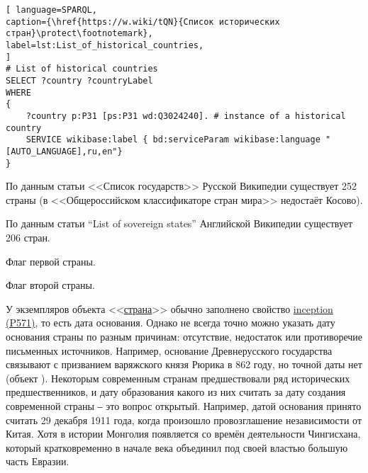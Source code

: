 \begin{lstlisting}[ language=SPARQL, 
caption={\href{https://w.wiki/tQN}{Список исторических стран}\protect\footnotemark},
label=lst:List_of_historical_countries, 
]
# List of historical countries
SELECT ?country ?countryLabel
WHERE
{
	?country p:P31 [ps:P31 wd:Q3024240]. # instance of a historical country 
	SERVICE wikibase:label { bd:serviceParam wikibase:language "[AUTO_LANGUAGE],ru,en"} 
}
\end{lstlisting}



По данным статьи <<Список государств>>\cite{list_of_sovereign_states} Русской Википедии существует 252 страны (в  <<Общероссийском классификаторе стран мира>> недостаёт Косово).

По данным статьи ``List of sovereign states''\cite{list_of_sovereign_states_en} Английской Википедии существует 206 стран.

\begin{marginfigure}[0.0cm]
	{
		\setlength{\fboxsep}{0pt}%
		\setlength{\fboxrule}{1pt}%
	}
	\caption{Флаг первой страны.}%
	\label{fig:flag_kor}%
\end{marginfigure}
\begin{marginfigure}[0.0cm]
	{
		\setlength{\fboxsep}{0pt}%
		\setlength{\fboxrule}{1pt}%
	}
	\caption{Флаг второй страны.}%
	\label{fig:flag_singapore}%
\end{marginfigure}


У экземпляров объекта <<\href{https://www.wikidata.org/wiki/Q6256}{страна}>> обычно заполнено свойство \href{https://www.wikidata.org/wiki/Property:P571}{inception (P571)}, то есть дата основания. Однако не всегда точно можно  указать дату основания страны по разным причинам: отсутствие, недостаток или противоречие письменных источников. Например, основание Древнерусского государства связывают с призванием варяжского князя Рюрика в 862 году, но точной даты нет (объект ). Некоторым современным странам предшествовали ряд исторических предшественников, и дату образования какого из них считать за дату создания современной страны ‒ это вопрос открытый. Например, датой основания  принято считать 29 декабря 1911 года, когда произошло провозглашение независимости от Китая. Хотя в истории Монголия появляется со времён деятельности Чингисхана, который кратковременно в начале \MakeUppercase{} века объединил под своей властью большую часть Евразии.



